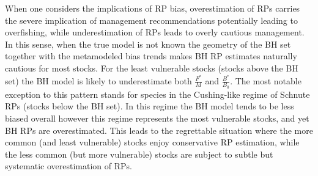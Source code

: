 
%
When one considers the implications of RP bias, overestimation of RPs carries
the severe implication of management recommendations potentially leading to
overfishing, while underestimation of RPs leads to overly cautious management.
In this sense, when the true model is not known the geometry of the BH set together
with the metamodeled bias trends makes BH RP estimates naturally cautious %
for most stocks. For the least vulnerable stocks (stocks above the BH set) the 
BH model is likely to underestimate both $\frac{F^*}{M}$ and $\frac{B^*}{B_0}$.
The most notable exception to this pattern stands for species in the Cushing-like 
regime of Schnute RPs (stocks below the BH set). In this regime the BH
model tends to be less biased overall however this regime represents the most 
vulnerable stocks, and yet BH RPs are overestimated. This leads to the regrettable
situation where the more common (and least vulnerable) stocks enjoy conservative 
RP estimation, while the less common (but more vulnerable) stocks are subject to 
subtle but systematic overestimation of RPs.

